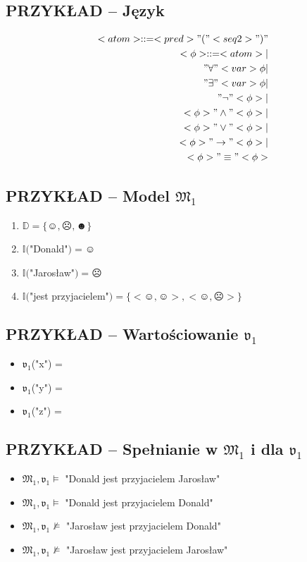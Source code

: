 \documentclass[12pt]{article}
\begin{document}
\subsection{PRZYKŁAD -- Język}
%
\begin{eqnarray}
<atom> ::= <pred>"("<seq2>")" \\
%
<\phi> ::= <atom> | \nonumber  \\ 
"\forall"<var> \phi | \nonumber  \\
"\exists"<var> \phi | \nonumber  \\
"\neg" <\phi> | \nonumber  \\
<\phi> "\land" <\phi> | \nonumber \\
<\phi> "\lor" <\phi> | \nonumber  \\
<\phi> "\to" <\phi> | \nonumber  \\
<\phi> "\equiv" <\phi>
\end{eqnarray}
%

\subsection{PRZYKŁAD -- Model $\mathfrak{M}_1$}
%
\begin{enumerate}
    \item $\mathbb{D} = \{\smiley{}, \frownie{}, \blacksmiley{} \}$%
    \item $\mathbb{I}($"Donald"$)=\smiley{}$%
    \item $\mathbb{I}($"Jarosław"$)=\frownie{}$%
    \item $\mathbb{I}($"jest przyjacielem"$)=\{<\smiley{}, \smiley{}>, <\smiley{}, \frownie{}> \}$
\end{enumerate}
%

\subsection{PRZYKŁAD -- Wartościowanie $\mathfrak{v}_1$}
%
\begin{itemize}
\item $\mathfrak{v}_1$("x") = \smiley{}
\item $\mathfrak{v}_1$("y") = \smiley{}
\item $\mathfrak{v}_1$("z") = \smiley{}
\end{itemize}
%

\subsection{PRZYKŁAD -- Spełnianie w $\mathfrak{M}_1$ i dla $\mathfrak{v}_1$}
%
\begin{itemize}
\item $\mathfrak{M}_1,\mathfrak{v}_1 \vDash$ "Donald jest przyjacielem Jarosław"%
\item $\mathfrak{M}_1,\mathfrak{v}_1 \vDash$ "Donald jest przyjacielem Donald"%
\item $\mathfrak{M}_1,\mathfrak{v}_1 \not \vDash$ "Jarosław jest przyjacielem Donald"%
\item $\mathfrak{M}_1,\mathfrak{v}_1 \not \vDash$ "Jarosław jest przyjacielem Jarosław"
\end{itemize}
%
\end{document}

